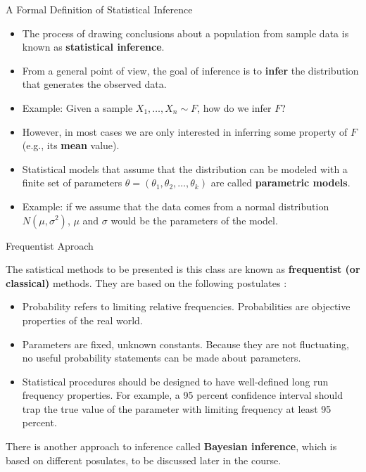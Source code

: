 \documentclass[handout]{beamer}
\begin{document}
\begin{frame}{A Formal Definition of Statistical Inference }
\scriptsize{
\begin{itemize}
 \item The process of drawing conclusions about a population from sample data is known as \textbf{statistical inference}.
\item From a general point of view, the goal of inference is to \textbf{infer} the distribution that generates the observed data.
\item Example: Given a sample $X_1, \dots, X_n \sim F$, how do we infer $F$? 
\item However, in most cases we are only interested in inferring some property of $F$ (e.g., its \textbf{mean} value).
\item Statistical models that assume that the distribution can be modeled with a finite set of parameters $\theta= (\theta_{1},\theta_{2},\dots,\theta_{k})$ are called \textbf{parametric models}. 
\item Example: if we assume that the data comes from a normal distribution $N(\mu,\sigma^2)$, $\mu$ and $\sigma$ would be the parameters of the model. 
\end{itemize}

} 
\end{frame}


\begin{frame}{Frequentist Aproach}
\scriptsize{
The satistical methods to be presented is this class are known as \textbf{frequentist (or classical)} methods. They are based on the following postulates  \cite{wasserman2013all}:
\begin{itemize}
\item Probability refers to limiting relative frequencies. Probabilities are objective properties of the real world.
\item Parameters are fixed, unknown constants. Because they are not fluctuating, no useful probability statements can be made about parameters.
\item Statistical procedures should be designed to have well-defined long run frequency properties. For example, a 95 percent confidence interval should trap the true value of the parameter with limiting frequency at least 95 percent.
\end{itemize}
There is another approach to inference called \textbf{Bayesian inference}, which is based on different posulates, to be discussed later in the course.

} 
\end{frame}
\end{document}
